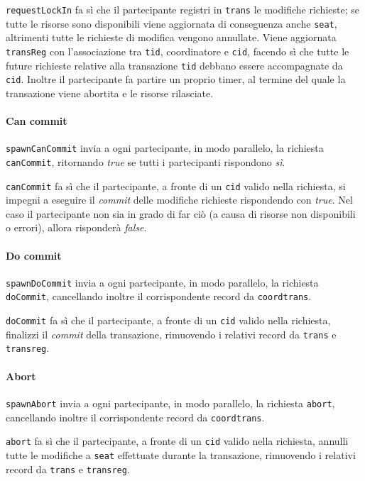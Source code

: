 \documentclass[a4paper]{article}
\begin{document}
\texttt{requestLockIn} fa sì che il partecipante registri in \texttt{trans} le modifiche richieste; se tutte le risorse sono disponibili viene aggiornata di conseguenza anche \texttt{seat}, altrimenti tutte le richieste di modifica vengono annullate. Viene aggiornata \texttt{transReg} con l'associazione tra \texttt{tid}, coordinatore e \texttt{cid}, facendo sì che tutte le future richieste relative alla transazione \texttt{tid} debbano essere accompagnate da \texttt{cid}.
Inoltre il partecipante fa partire un proprio timer, al termine del quale la transazione viene abortita e le risorse rilasciate.

\paragraph{Can commit}\texttt{spawnCanCommit} invia a ogni partecipante, in modo parallelo, la richiesta \texttt{canCommit}, ritornando \textit{true} se tutti i partecipanti rispondono \textit{sì}.

\texttt{canCommit} fa sì che il partecipante, a fronte di un \texttt{cid} valido nella richiesta, si impegni a eseguire il \textit{commit} delle modifiche richieste rispondendo con \textit{true}. Nel caso il partecipante non sia in grado di far ciò (a causa di risorse non disponibili o errori), allora risponderà \textit{false}.

\paragraph{Do commit}\texttt{spawnDoCommit} invia a ogni partecipante, in modo parallelo, la richiesta \texttt{doCommit}, cancellando inoltre il corrispondente record da \texttt{coordtrans}.

\texttt{doCommit} fa sì che il partecipante, a fronte di un \texttt{cid} valido nella richiesta, finalizzi il \textit{commit} della transazione, rimuovendo i relativi record da \texttt{trans} e \texttt{transreg}. %

\paragraph{Abort}\texttt{spawnAbort} invia a ogni partecipante, in modo parallelo, la richiesta \texttt{abort}, cancellando inoltre il corrispondente record da \texttt{coordtrans}.

\texttt{abort} fa sì che il partecipante, a fronte di un \texttt{cid} valido nella richiesta, annulli tutte le modifiche a \texttt{seat} effettuate durante la transazione, rimuovendo i relativi record da \texttt{trans} e \texttt{transreg}.
\end{document}
